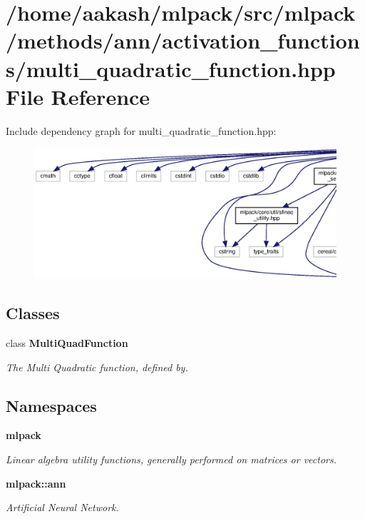 \section{/home/aakash/mlpack/src/mlpack/methods/ann/activation\+\_\+functions/multi\+\_\+quadratic\+\_\+function.hpp File Reference}
\label{multi__quadratic__function_8hpp}
Include dependency graph for multi\+\_\+quadratic\+\_\+function.\+hpp\+:
\nopagebreak
\begin{figure}[H]
\begin{center}
\leavevmode
\includegraphics[width=350pt]{multi__quadratic__function_8hpp__incl}
\end{center}
\end{figure}
\subsection*{Classes}
\begin{DoxyCompactItemize}
\item 
class \textbf{ Multi\+Quad\+Function}
\begin{DoxyCompactList}\small\item\em The Multi Quadratic function, defined by. \end{DoxyCompactList}\end{DoxyCompactItemize}
\subsection*{Namespaces}
\begin{DoxyCompactItemize}
\item 
 \textbf{ mlpack}
\begin{DoxyCompactList}\small\item\em Linear algebra utility functions, generally performed on matrices or vectors. \end{DoxyCompactList}\item 
 \textbf{ mlpack\+::ann}
\begin{DoxyCompactList}\small\item\em Artificial Neural Network. \end{DoxyCompactList}\end{DoxyCompactItemize}


